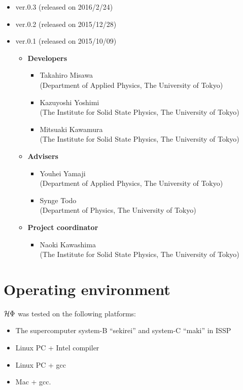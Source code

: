 \begin{itemize}
\item{ver.0.3 (released on 2016/2/24)}
\item{ver.0.2 (released on 2015/12/28)}
\item{ver.0.1 (released on 2015/10/09)}
\begin{itemize}
	\item{\bf Developers}
	\begin{itemize}
	\item{Takahiro Misawa \\(Department of Applied Physics, The University of Tokyo)}
	\item{Kazuyoshi Yoshimi\\ (The Institute for Solid State Physics, The University of Tokyo)}
	\item{Mitsuaki Kawamura\\ (The Institute for Solid State Physics, The University of Tokyo)}
	\end{itemize}
	\item{\bf Advisers}
	\begin{itemize}
	\item{Youhei Yamaji\\ (Department of Applied Physics, The University of Tokyo)}
	\item{Synge Todo\\ (Department of Physics, The University of Tokyo)}
	\end{itemize}
	\item{\bf Project coordinator}
	\begin{itemize}
	\item{Naoki Kawashima\\ (The Institute for Solid State Physics, The University of Tokyo)}
	\end{itemize}
\end{itemize}
\end{itemize}

\section{Operating environment}
 $\mathcal{H} \Phi$ was tested on the following platforms:

\begin{itemize}
\item The supercomputer system-B ``sekirei'' and system-C ``maki'' in ISSP
\item Linux PC + Intel compiler
\item Linux PC + gcc
\item Mac + gcc.
\end{itemize}
